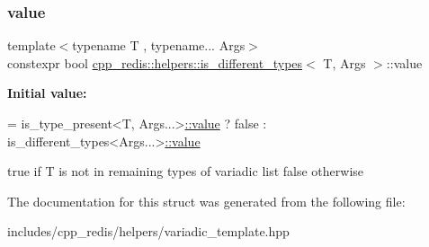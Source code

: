 \subsubsection{\texorpdfstring{value}{value}}
{\footnotesize\ttfamily template$<$typename T , typename... Args$>$ \\
constexpr bool \hyperlink{structcpp__redis_1_1helpers_1_1is__different__types}{cpp\+\_\+redis\+::helpers\+::is\+\_\+different\+\_\+types}$<$ T, Args $>$\+::value\hspace{0.3cm}{\ttfamily [static]}}

{\bfseries Initial value\+:}
\begin{DoxyCode}
= is\_type\_present<T, Args...>\hyperlink{structcpp__redis_1_1helpers_1_1is__different__types_a07dadd8ff3c8024734f231aaf1555626}{::value}
                                  ? false
                                  : is\_different\_types<Args...>\hyperlink{structcpp__redis_1_1helpers_1_1is__different__types_a07dadd8ff3c8024734f231aaf1555626}{::value}
\end{DoxyCode}
true if T is not in remaining types of variadic list false otherwise 

The documentation for this struct was generated from the following file\+:\begin{DoxyCompactItemize}
\item 
includes/cpp\+\_\+redis/helpers/variadic\+\_\+template.\+hpp\end{DoxyCompactItemize}
